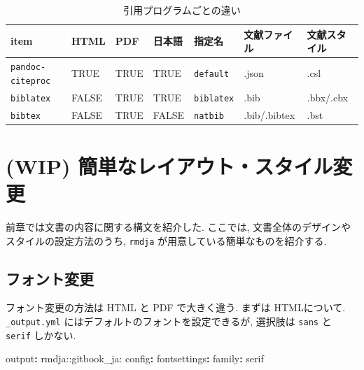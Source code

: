 \documentclass[
  xelatex,ja=standard,jafont=noto]{bxjsbook}
\newenvironment{Shaded}{\begin{snugshade}}{\end{snugshade}}
\newcommand{\AttributeTok}[1]{\textcolor[rgb]{0.77,0.63,0.00}{#1}}
\newcommand{\FunctionTok}[1]{\textcolor[rgb]{0.00,0.00,0.00}{#1}}
\newcommand{\KeywordTok}[1]{\textcolor[rgb]{0.13,0.29,0.53}{\textbf{#1}}}
\theoremstyle{definition}
\theoremstyle{definition}
\theoremstyle{definition}
\theoremstyle{definition}
\theoremstyle{remark}
\begin{document}
\begin{table}

\caption{\label{tab:biblio-comparison}引用プログラムごとの違い}
\centering
\begin{tabular}[t]{lllllll}
\toprule
item & HTML & PDF & 日本語 & 指定名 & 文献ファイル & 文献スタイル\\
\midrule
\texttt{pandoc-citeproc} & TRUE & TRUE & TRUE & \texttt{default} & .json & .csl\\
\texttt{biblatex} & FALSE & TRUE & TRUE & \texttt{biblatex} & .bib & .bbx/.cbx\\
\texttt{bibtex} & FALSE & TRUE & FALSE & \texttt{natbib} & .bib/.bibtex & .bst\\
\bottomrule
\end{tabular}
\end{table}

\hypertarget{wip-ux7c21ux5358ux306aux30ecux30a4ux30a2ux30a6ux30c8ux30b9ux30bfux30a4ux30ebux5909ux66f4}{%
\chapter{(WIP)
簡単なレイアウト・スタイル変更}\label{wip-ux7c21ux5358ux306aux30ecux30a4ux30a2ux30a6ux30c8ux30b9ux30bfux30a4ux30ebux5909ux66f4}}

前章では文書の内容に関する構文を紹介した. ここでは,
文書全体のデザインやスタイルの設定方法のうち, \texttt{rmdja}
が用意している簡単なものを紹介する.

\hypertarget{ux30d5ux30a9ux30f3ux30c8ux5909ux66f4}{%
\section{フォント変更}\label{ux30d5ux30a9ux30f3ux30c8ux5909ux66f4}}

フォント変更の方法は HTML と PDF で大きく違う. まずは HTMLについて.
\texttt{\_output.yml} にはデフォルトのフォントを設定できるが, 選択肢は
\texttt{sans} と \texttt{serif} しかない.

\begin{Shaded}
\begin{Highlighting}[]
\FunctionTok{output}\KeywordTok{:}\AttributeTok{ rmdja::gitbook\_ja:}
\AttributeTok{  }\FunctionTok{config}\KeywordTok{:}
\AttributeTok{    }\FunctionTok{fontsettings}\KeywordTok{:}
\AttributeTok{      }\FunctionTok{family}\KeywordTok{:}\AttributeTok{ serif}
\end{Highlighting}
\end{Shaded}
\end{document}
